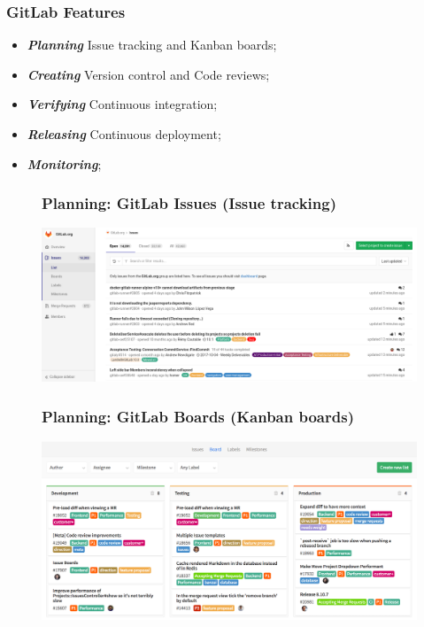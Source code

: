 \documentclass[notes]{beamer}
\begin{document}
\begin{frame}
 \frametitle{GitLab Features}
 \begin{itemize}[<+->]
    \item \textbf{\textit{Planning}} Issue tracking	and Kanban boards;
    \item \textbf{\textit{Creating}} Version control and Code reviews;   
    \item \textbf{\textit{Verifying}} Continuous integration;
    \item \textbf{\textit{Releasing}} Continuous deployment;
    \item \textbf{\textit{Monitoring}};
  \end{itemize}
\end{frame}

\begin{frame}
  \begin{figure}
    \frametitle{Planning: GitLab Issues (Issue tracking)}
    \centering
    \includegraphics[scale=0.2]{issues.png}
  \end{figure}
\end{frame}

\begin{frame}
  \begin{figure}
    \frametitle{Planning: GitLab Boards (Kanban boards)}
    \centering
    \includegraphics[scale=0.165]{boards.png}
  \end{figure}
\end{frame}
\end{document}
